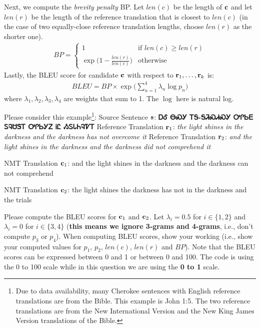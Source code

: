 \begin{parts}
    Next, we compute the \textit{brevity penalty} BP. Let $len(c)$ be the length of $\mathbf{c}$ and let $len(r)$ be the length of the reference translation that is closest to $len(c)$ (in the case of two equally-close reference translation lengths, choose $len(r)$ as the shorter one). 
    \begin{align}
        BP = 
        \begin{cases}
            1 & \text{if } len(c) \ge len(r) \\
            \exp \big( 1 - \frac{len(r)}{len(c)} \big) & \text{otherwise}
        \end{cases}
    \end{align}
    Lastly, the BLEU score for candidate $\mathbf{c}$ with respect to $\mathbf{r}_1,\dots,\mathbf{r}_k$ is:
    \begin{align}
        BLEU = BP \times \exp \Big( \sum_{n=1}^4 \lambda_n \log p_n \Big)
    \end{align}
    where $\lambda_1,\lambda_2,\lambda_3,\lambda_4$ are weights that sum to 1. The $\log$ here is natural log.
    \newline
    \begin{subparts}
        \subpart[5] Please consider this example\footnote{Due to data availability, many Cherokee sentences with English reference translations are from the Bible. This example is John 1:5. The two reference translations are from the New International Version and the New King James Version translations of the Bible.}: \newline
        Source Sentence $\mathbf{s}$: \textbf{{\cherokeefam ᎠᎴ ᎾᏍᎩ ᎢᎦ-ᎦᏘᏍᏗᏍᎩ ᎤᎵᏏᎬ ᏚᎸᏌᏕᎢ ᎤᎵᏏᎩᏃ ᎥᏝ ᏱᏚᏓᏂᎸᏤᎢ}} 
        \newline
        Reference Translation $\mathbf{r}_1$: \textit{the light shines in the darkness and the darkness has not overcome it}
        \newline
        Reference Translation $\mathbf{r}_2$: \textit{and the light shines in the darkness and the darkness did not comprehend it}
        
        NMT Translation $\mathbf{c}_1$: and the light shines in the darkness and the darkness can not comprehend
        
        NMT Translation $\mathbf{c}_2$: the light shines the darkness has not in the darkness and the trials
        
        Please compute the BLEU scores for $\mathbf{c}_1$ and $\mathbf{c}_2$. Let $\lambda_i=0.5$ for $i\in\{1,2\}$ and $\lambda_i=0$ for $i\in\{3,4\}$ (\textbf{this means we ignore 3-grams and 4-grams}, i.e., don't compute $p_3$ or $p_4$). When computing BLEU scores, show your working (i.e., show your computed values for $p_1$, $p_2$, $len(c)$, $len(r)$ and $BP$). Note that the BLEU scores can be expressed between 0 and 1 or between 0 and 100. The code is using the 0 to 100 scale while in this question we are using the \textbf{0 to 1} scale.
        \newline
        

\end{subparts}
\end{parts}
